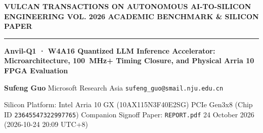 \documentclass[11pt,a4paper]{article}
\begin{document}
{\scriptsize\sffamily\textcolor{vulcan}{\textbf{VULCAN TRANSACTIONS ON AUTONOMOUS AI-TO-SILICON ENGINEERING \hfill VOL. 2026 \textperiodcentered{} ACADEMIC BENCHMARK \& SILICON PAPER}}\par}

\vspace{1pt}\textcolor{vulcan}{\rule{\textwidth}{1.2pt}}\vspace{3pt}

\begin{center}

{\sffamily\LARGE\bfseries Anvil-Q1 · W4A16 Quantized LLM Inference Accelerator: Microarchitecture, 100~MHz+ Timing Closure, and Physical Arria 10 FPGA Evaluation\par}\vspace{3pt}

{\small\sffamily\textbf{Sufeng Guo} \textperiodcentered{} Microsoft Research Asia \textperiodcentered{} \texttt{sufeng\_guo@smail.nju.edu.cn}\par}\vspace{1pt}

{\scriptsize\sffamily\textcolor{black!75}{Silicon Platform: Intel Arria 10 GX (\allowbreak{}10AX115N3F40E2SG)\allowbreak{} PCIe Gen3x8 (Chip ID \texttt{23645547322997765}) \textperiodcentered{} Companion Signoff Paper: \texttt{REPORT.pdf} \textperiodcentered{} 24 October 2026 (\allowbreak{}2026-10-24 20:09 UTC+\allowbreak{}8)\allowbreak{}}\par}

\end{center}\vspace{2pt}
\end{document}
